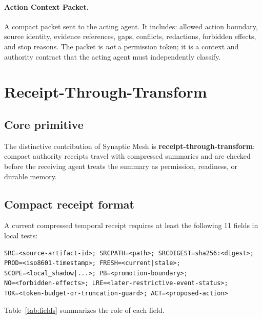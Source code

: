\documentclass[11pt]{article}
\begin{document}
\paragraph{Action Context Packet.}
A compact packet sent to the acting agent. It includes: allowed action boundary,
source identity, evidence references, gaps, conflicts, redactions, forbidden effects,
and stop reasons. The packet is \emph{not} a permission token; it is a context and
authority contract that the acting agent must independently classify.

\section{Receipt-Through-Transform}
\label{sec:receipt}

\subsection{Core primitive}

The distinctive contribution of Synaptic Mesh is \textbf{receipt-through-transform}:
compact authority receipts travel with compressed summaries and are checked before
the receiving agent treats the summary as permission, readiness, or durable memory.

\subsection{Compact receipt format}

A current compressed temporal receipt requires at least the following 11 fields in
local tests:

\begin{lstlisting}
SRC=<source-artifact-id>; SRCPATH=<path>; SRCDIGEST=sha256:<digest>;
PROD=<iso8601-timestamp>; FRESH=<current|stale>;
SCOPE=<local_shadow|...>; PB=<promotion-boundary>;
NO=<forbidden-effects>; LRE=<later-restrictive-event-status>;
TOK=<token-budget-or-truncation-guard>; ACT=<proposed-action>
\end{lstlisting}

Table~\ref{tab:fields} summarizes the role of each field.
\end{document}
